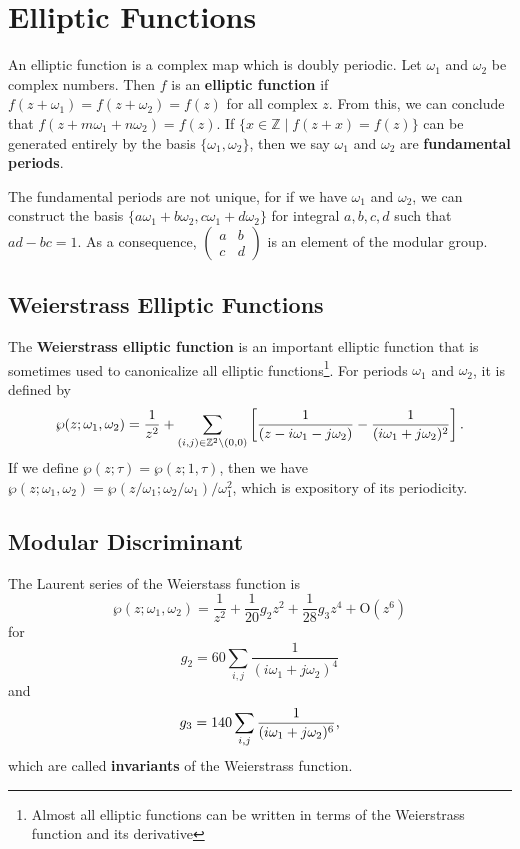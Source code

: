 \documentclass{microdoc}
\newcommand{\defn}[1]{\textbf{#1}}
\begin{document}
\section{Elliptic Functions}
An elliptic function is a complex map which is doubly periodic. Let
$\omega_1$ and $\omega_2$ be complex numbers. Then $f$ is an
\defn{elliptic function} if $f(z+\omega_1)=f(z+\omega_2)=f(z)$ for all complex
$z$. From this, we can conclude that
$f(z+m\omega_1+n\omega_2)=f(z)$. If $\{x\in\mathbb{Z}\mid
f(z+x)=f(z)\}$ can be generated entirely by the basis
$\{\omega_1,\omega_2\}$, then we say $\omega_1$ and $\omega_2$ are
\defn{fundamental periods}.

The fundamental periods are not unique, for if we have $\omega_1$ and
$\omega_2$, we can construct the basis $\{a\omega_1+b\omega_2,
c\omega_1+d\omega_2\}$ for integral $a,b,c,d$ such that $ad-bc=1$. As
a consequence, $\left(
\begin{smallmatrix}
  a & b\\c & d
\end{smallmatrix}
\right)$ is an element of the modular group.

\subsection{Weierstrass Elliptic Functions}
The \defn{Weierstrass elliptic function} is an important elliptic function
that is sometimes used to canonicalize all elliptic
functions\footnote{Almost all elliptic functions can be written in
  terms of the Weierstrass function and its derivative}. For periods
$\omega_1$ and $\omega_2$, it is defined by
\begin{equation}
\wp(z; \omega_1, \omega_2) = \frac{1}{z^2} + \sum_{(i,j)\in\mathbb{Z}^2\setminus(0,0)}
    \left[\frac{1}{(z-i\omega_1-j\omega_2)} - \frac{1}{(i\omega_1+j\omega_2)^2}\right]\text.
\end{equation}
If we define $\wp(z;\tau)=\wp(z;1,\tau)$, then we have
$\wp(z;\omega_1,\omega_2)=\wp(z/\omega_1;\omega_2/\omega_1)/\omega_1^2$,
which is expository of its periodicity.

\subsection{Modular Discriminant}
The Laurent series of the Weierstass function is
\[
\wp(z;\omega_1,\omega_2) = \frac{1}{z^2} + \frac{1}{20}g_2 z^2 +
\frac{1}{28}g_3 z^4 + \mathrm{O}(z^6)
\]
for
\[
g_2 = 60 \sum_{i,j}\frac{1}{(i\omega_1+j\omega_2)^{4}}
\]
and
\[
g_3 = 140 \sum_{i,j}\frac{1}{(i\omega_1+j\omega_2)^{6}}\text,
\]
which are called \defn{invariants} of the Weierstrass function.
\end{document}
